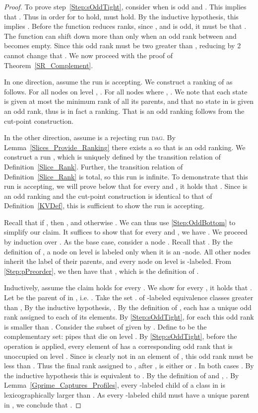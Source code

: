 \documentclass{LMCS}
\newcommand{\DAG}{\textsc{dag}\xspace}
\begin{document}
\begin{proof}
To prove step~\ref{Step:sOddTight}, consider when  is odd and . This implies that . Thus in order for 
 to hold,  must hold. By the inductive hypothesis, this
implies . Before the  function reduces ranks, since 
, and  is odd, it must be that .
The \tighten function can shift  down more than  only when an odd rank
between  and  becomes empty. Since this odd rank must be two greater than
, reducing  by 2 cannot change that .  We now proceed with the proof of Theorem~\ref{SR_Complement}. 

In one direction, assume the run
  is accepting.  We construct
a ranking  of  as follows. For all nodes  on level , . For all nodes
 where , .  We note that each state is given at most the
minimum rank of all its parents, and that no state in  is given an odd rank, thus  is in fact
a ranking. That  is an odd ranking follows from the cut-point construction.

In the other direction, assume  is a rejecting run \DAG. By Lemma~\ref{Slices_Provide_Ranking}
there exists a  so that  is an odd ranking. We construct a run
, which is uniquely defined
by the transition relation of Definition~\ref{Slice_Rank}. Further, the transition relation of
Definition~\ref{Slice_Rank} is total, so this run is infinite. To demonstrate that this run is
accepting, we will prove below that for every  and , it holds that .  Since  is an odd ranking and the cut-point construction is identical
to that of Definition~\ref{KVDef}, this is sufficient to show the run is accepting.

Recall that if , then , and otherwise
. We can thus use \ref{Step:OddBottom} to simplify our claim. 
It suffices to show that for every  and , we have 
.  We proceed by induction over .  As the
base case, consider a node . Recall that . By
the definition of , a node on level  is labeled  only when it is an -node.
All other nodes inherit the label of their parents, and every node on level  is -labeled.
From \ref{Step:pPreorder}, we then have that 
,
which is the definition of .

Inductively, assume the claim holds for every . We show for every , it
holds that .
Let  be the parent of  in
, i.e. .  Take the set .  of
-labeled equivalence classes greater than , By the inductive hypothesis, 
.  By the definition of , each 
 has a unique odd rank assigned to each of its elements.  By \ref{Step:sOddTight}, for each 
this odd rank is smaller than . Consider the subset of 
given by
\top.  Define
 to be the complementary set: pipes that die on level . By
\ref{Step:sOddTight}, before the  operation is applied, every element of  has a
corresponding odd rank that is unoccupied on level .  Since  is clearly not in an element of
, this odd rank must be less than .  Thus the final rank
assigned to , after , is either
 or .  In both cases 
.  By the inductive hypothesis this is
equivalent to .  By the definition of  and
, .  By Lemma~\ref{Gprime_Captures_Profiles}, every
-labeled child of a class in  is lexicographically larger than . As every
-labeled child must have a unique parent in , we conclude that
.
\cbend
\end{proof}
\end{document}
